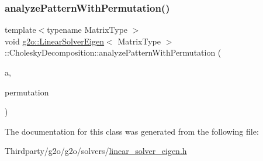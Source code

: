 \subsubsection{\texorpdfstring{analyze\+Pattern\+With\+Permutation()}{analyzePatternWithPermutation()}}
{\footnotesize\ttfamily template$<$typename Matrix\+Type $>$ \\
void \mbox{\hyperlink{classg2o_1_1_linear_solver_eigen}{g2o\+::\+Linear\+Solver\+Eigen}}$<$ Matrix\+Type $>$\+::Cholesky\+Decomposition\+::analyze\+Pattern\+With\+Permutation (\begin{DoxyParamCaption}\item[{\mbox{\hyperlink{classg2o_1_1_linear_solver_eigen_aeb7e2400bed3a249b5f29ce7cc00cd33}{Sparse\+Matrix}} \&}]{a,  }\item[{const \mbox{\hyperlink{classg2o_1_1_linear_solver_eigen_acd9dd4e15dfbbad2720f1b83519333e8}{Permutation\+Matrix}} \&}]{permutation }\end{DoxyParamCaption})\hspace{0.3cm}{\ttfamily [inline]}}



The documentation for this class was generated from the following file\+:\begin{DoxyCompactItemize}
\item 
Thirdparty/g2o/g2o/solvers/\mbox{\hyperlink{linear__solver__eigen_8h}{linear\+\_\+solver\+\_\+eigen.\+h}}\end{DoxyCompactItemize}
